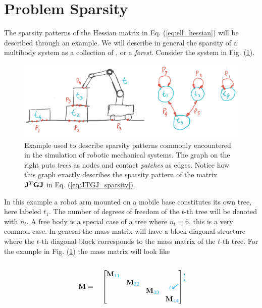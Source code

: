 \section{Problem Sparsity}

The sparsity patterns of the Hessian matrix in Eq. (\ref{eq:ell_hessian}) will
be described through an example. We will describe in general the sparsity of a
multibody system as a collection of , or a
\textit{forest}. Consider the system in Fig. (\ref{fig:sparsity_example}).
\begin{figure}[!h]
	\centering
	\includegraphics[width=0.7\columnwidth]{figures/sparsity_example.png}
	\caption{\label{fig:sparsity_example} 
	Example used to describe sparsity patterns commonly encountered in the
	simulation of robotic mechanical systems. The graph on the right puts
	\textit{trees} as nodes and contact \textit{patches} as edges. Notice how
	this graph exactly describes the sparsity pattern of the matrix
	${\mathbf{J}}^T{\mathbf{G}}{\mathbf{J}}$ in Eq. (\ref{eq:JTGJ_sparsity}).}
\end{figure}
In this example a robot arm mounted on a mobile base constitutes its own tree,
here labeled $t_1$. The number of degrees of freedom of the $t\text{-th}$ tree
will be denoted with $n_t$. A free body is a special case of a tree where
$n_t=6$, this is a very common case. In general the mass matrix will have a
block diagonal structure where the $t\text{-th}$ diagonal block corresponds to
the mass matrix of the $t\text{-th}$ tree. For the example in Fig.
(\ref{fig:sparsity_example}) the mass matrix will look like\\\\
\begin{equation}
	\mf{M}=\quad
	\begin{bmatrix}
		\tikzmark{M_topleft}
		\diagentry{\mf{M}_{\cc{11}}}&&&\tikzmark{M_topright}\\
		&\diagentry{\mf{M}_{\cc{22}}}\\
		&&\diagentry{\mf{M}_{\cc{33}}}\\		
		\tikzmark{M_bottomleft}&&&\diagentry{\mf{M}_{\cc{44}}}
	\end{bmatrix}
\tikz[overlay,remember picture] {
	\draw[->,thick,color=cyan]
  ([yshift=3ex]M_topleft) -- ([yshift=3ex]M_topright) node[midway,above]
  {\scriptsize $t$}; 
  \draw[->,thick,color=cyan]
  ([yshift=1.5ex,xshift=-2ex]M_topleft) -- ([xshift=-4ex]M_bottomleft)
  node[near end,left] {\scriptsize $t$};}	
\end{equation}

